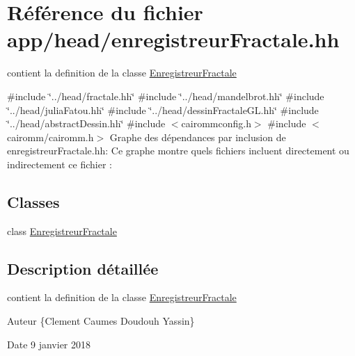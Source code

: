 \hypertarget{enregistreurFractale_8hh}{}\section{Référence du fichier app/head/enregistreur\+Fractale.hh}
\label{enregistreurFractale_8hh}


contient la definition de la classe \hyperlink{classEnregistreurFractale}{Enregistreur\+Fractale}  


{\ttfamily \#include \char`\"{}../head/fractale.\+hh\char`\"{}}\newline
{\ttfamily \#include \char`\"{}../head/mandelbrot.\+hh\char`\"{}}\newline
{\ttfamily \#include \char`\"{}../head/julia\+Fatou.\+hh\char`\"{}}\newline
{\ttfamily \#include \char`\"{}../head/dessin\+Fractale\+G\+L.\+hh\char`\"{}}\newline
{\ttfamily \#include \char`\"{}../head/abstract\+Dessin.\+hh\char`\"{}}\newline
{\ttfamily \#include $<$cairommconfig.\+h$>$}\newline
{\ttfamily \#include $<$cairomm/cairomm.\+h$>$}\newline
Graphe des dépendances par inclusion de enregistreur\+Fractale.\+hh\+:
Ce graphe montre quels fichiers incluent directement ou indirectement ce fichier \+:
\subsection*{Classes}
\begin{DoxyCompactItemize}
\item 
class \hyperlink{classEnregistreurFractale}{Enregistreur\+Fractale}
\end{DoxyCompactItemize}


\subsection{Description détaillée}
contient la definition de la classe \hyperlink{classEnregistreurFractale}{Enregistreur\+Fractale} 

\begin{DoxyAuthor}{Auteur}
\{Clement Caumes Doudouh Yassin\} 
\end{DoxyAuthor}
\begin{DoxyDate}{Date}
9 janvier 2018 
\end{DoxyDate}
